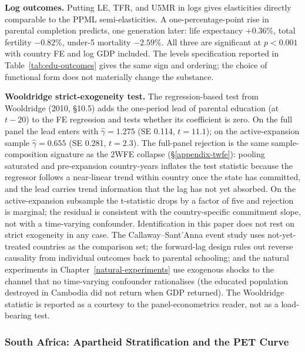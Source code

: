 \documentclass[12pt,letterpaper]{article}
\begin{document}
{\textbf{Log outcomes.} Putting LE, TFR, and U5MR in logs gives elasticities
directly comparable to the PPML semi-elasticities. A one-percentage-point
rise in parental completion predicts, one generation later: life expectancy
$+0.36\%$, total fertility $-0.82\%$, under-5 mortality $-2.59\%$. All
three are significant at $p<0.001$ with country FE and log GDP
included. The levels specification reported in Table~\ref{tab:edu-outcomes} gives the
same sign and ordering; the choice of functional form does not materially
change the substance.

\textbf{Wooldridge strict-exogeneity test.} The regression-based test
from Wooldridge (2010, §10.5) adds the one-period lead of parental
education (at $t-20$) to the FE regression and tests whether its
coefficient is zero. On the full panel the lead enters with
$\hat\gamma=1.275$ (SE 0.114, $t=11.1$); on the active-expansion
sample $\hat\gamma=0.655$ (SE 0.281, $t=2.3$). The full-panel
rejection is the same sample-composition signature as the 2WFE
collapse (\S\ref{appendix-twfe}): pooling saturated and pre-expansion
country-years inflates the test statistic because the regressor
follows a near-linear trend within country once the state has
committed, and the lead carries trend information that the lag has not
yet absorbed. On the active-expansion subsample the t-statistic drops
by a factor of five and rejection is marginal; the residual is
consistent with the country-specific commitment slope, not with a
time-varying confounder. Identification in this paper does not rest
on strict exogeneity in any case. The Callaway--Sant'Anna event study
uses not-yet-treated countries as the comparison set; the forward-lag
design rules out reverse causality from individual outcomes back to
parental schooling; and the natural experiments in
Chapter~\ref{natural-experiments} use exogenous shocks to the channel
that no time-varying confounder rationalises (the educated population
destroyed in Cambodia did not return when GDP returned). The
Wooldridge statistic is reported as a courtesy to the
panel-econometrics reader, not as a load-bearing test.

\subsubsection{South Africa: Apartheid Stratification and the PET Curve}\label{appendix-south-africa}

}
\end{document}
